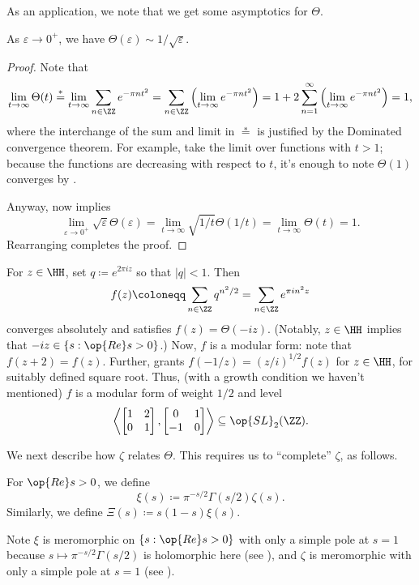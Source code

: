 \documentclass[../notes.tex]{subfiles}
\begin{document}
As an application, we note that we get some asymptotics for $\Theta$.
\begin{corollary} \label{cor:theta-near-zero}
	As $\varepsilon\to0^+$, we have $\Theta(\varepsilon)\sim1/\sqrt\varepsilon$.
\end{corollary}
\begin{proof}
	Note that
	\[\lim_{t\to\infty}\Theta(t)\stackrel*=\lim_{t\to\infty}\sum_{n\in\ZZ}e^{-\pi nt^2}=\sum_{n\in\ZZ}\left(\lim_{t\to\infty}e^{-\pi nt^2}\right)=1+2\sum_{n=1}^\infty\left(\lim_{t\to\infty}e^{-\pi nt^2}\right)=1,\]
	where the interchange of the sum and limit in $\stackrel*=$ is justified by the Dominated convergence theorem. For example, take the limit over functions with $t>1$; because the functions are decreasing with respect to $t$, it's enough to note $\Theta(1)$ converges by .
	
	Anyway,  now implies
	\[\lim_{\varepsilon\to0^+}\sqrt\varepsilon\Theta(\varepsilon)=\lim_{t\to\infty}\sqrt{1/t}\Theta(1/t)=\lim_{t\to\infty}\Theta(t)=1.\]
	Rearranging completes the proof.
\end{proof}
\begin{remark}
	For $z\in\HH$, set $q\coloneqq e^{2\pi iz}$ so that $|q|<1$. Then
	\[f(z)\coloneqq\sum_{n\in\ZZ}q^{n^2/2}=\sum_{n\in\ZZ}e^{\pi in^2z}\]
	converges absolutely and satisfies $f(z)=\Theta(-iz)$. (Notably, $z\in\HH$ implies that $-iz\in\{s:\op{Re}s>0\}$.) Now, $f$ is a modular form: note that $f(z+2)=f(z)$. Further,  grants $f(-1/z)=(z/i)^{1/2}f(z)$ for $z\in\HH$, for suitably defined square root. Thus, (with a growth condition we haven't mentioned) $f$ is a modular form of weight $1/2$ and level
	\[\left\langle\begin{bmatrix}
		1 & 2 \\
		0 & 1
	\end{bmatrix},\begin{bmatrix}
		0 & 1 \\
		-1 & 0
	\end{bmatrix}\right\rangle\subseteq\op{SL}_2(\ZZ).\]
\end{remark}
We next describe how $\zeta$ relates $\Theta$. This requires us to ``complete'' $\zeta$, as follows.
\begin{defihelper}[{$\xi$}] 
	For $\op{Re}s>0$, we define
	\[\xi(s)\coloneqq\pi^{-s/2}\Gamma(s/2)\zeta(s).\]
	Similarly, we define $\Xi(s)\coloneqq s(1-s)\xi(s)$.
\end{defihelper}
\begin{remark}
	Note $\xi$ is meromorphic on $\{s:\op{Re}s>0\}$ with only a simple pole at $s=1$ because $s\mapsto\pi^{-s/2}\Gamma(s/2)$ is holomorphic here (see ), and $\zeta$ is meromorphic with only a simple pole at $s=1$ (see ).
\end{remark}
\end{document}
